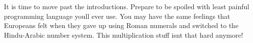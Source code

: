 It is time to move past the introductions. Prepare to be spoiled with
least painful programming language
you{\textquotesingle}ll ever use. You may have the same feelings that
Europeans felt when they gave up using Roman numerals and
switched to the Hindu-Arabic number system. {\textquotedbl}This
multiplication stuff isn{\textquotesingle}t that hard
anymore!{\textquotedbl} 
